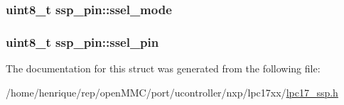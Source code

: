 \hypertarget{structssp__pin_a6d4a71091387fb47ef820f185adca4f9}{
\subsubsection[{ssel\-\_\-mode}]{\setlength{\rightskip}{0pt plus 5cm}uint8\-\_\-t ssp\-\_\-pin\-::ssel\-\_\-mode}}\label{structssp__pin_a6d4a71091387fb47ef820f185adca4f9}
\hypertarget{structssp__pin_a9d565c2f896dcc50463751cd3eb4e0ac}{
\subsubsection[{ssel\-\_\-pin}]{\setlength{\rightskip}{0pt plus 5cm}uint8\-\_\-t ssp\-\_\-pin\-::ssel\-\_\-pin}}\label{structssp__pin_a9d565c2f896dcc50463751cd3eb4e0ac}


The documentation for this struct was generated from the following file\-:\begin{DoxyCompactItemize}
\item 
/home/henrique/rep/open\-M\-M\-C/port/ucontroller/nxp/lpc17xx/\hyperlink{lpc17__ssp_8h}{lpc17\-\_\-ssp.\-h}\end{DoxyCompactItemize}
